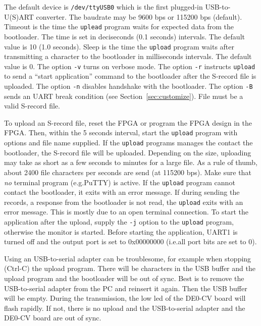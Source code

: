 \documentclass[12pt]{article}
\begin{document}
The default device is \lstinline|/dev/ttyUSB0| which is the first plugged-in USB-to-U(S)ART converter. The baudrate may be 9600 bps or 115200 bps (default). Timeout is the time the \lstinline|uplead| program waits for expected data from the bootloader. The time is set in deciseconds (0.1 seconds) intervals. The default value is 10 (1.0 seconds). Sleep is the time the \lstinline|upload| program waits after transmitting a character to the bootloader in milliseconds intervals. The default value is 0. The option \lstinline|-v| turns on verbose mode. The option \lstinline[]|-r| instructs \lstinline|upload| to send a ``start application'' command to the bootloader after the S-record file is uploaded. The option \lstinline|-n| disables handshake with the bootloader. The option \lstinline|-B| sends an UART break condition (see Section~\ref{sec:customize}). File must be a valid S-record file.

To upload an S-record file, reset the FPGA or program the FPGA design in the FPGA. Then, within the 5 seconds interval, start the \lstinline|upload| program with options and file name supplied. If the \lstinline|upload| programs manages the contact the bootloader, the S-record file will be uploaded. Depending on the size, uploading may take as short as a few seconds to minutes for a large file. As a rule of thumb, about 2400 file characters per seconds are send (at 115200 bps). Make sure that \emph{no} terminal program (e.g.\@ PuTTY) is active. If the \lstinline|upload| program cannot contact the bootloader, it exits with an error message. If during sending the records, a response from the bootloader is not read, the \lstinline|upload| exits with an error message. This is mostly due to an open terminal connection. To start the application after the upload, supply the \lstinline|-j| option to the \lstinline|upload| program, otherwise the monitor is started. Before starting the application, UART1 is turned off and the output port is set to 0x00000000 (i.e.\@ all port bits are set to 0).

Using an USB-to-serial adapter can be troublesome, for example when stopping (Ctrl-C) the upload program. There will be characters in the USB buffer and the upload program and the bootloader will be out of sync. Best is to remove the USB-to-serial adapter from the PC and reinsert it again. Then the USB buffer will be empty. During the transmission, the low led of the DE0-CV board will flash rapidly. If not, there is no upload and the USB-to-serial adapter and the DE0-CV board are out of sync.
\end{document}
